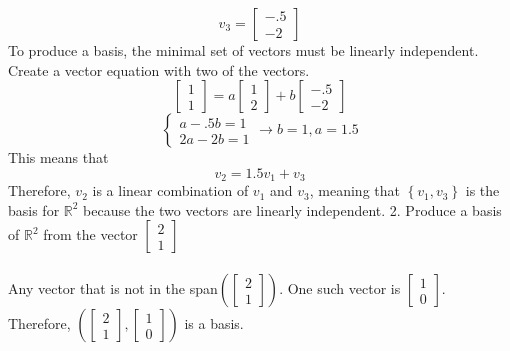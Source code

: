 \begin{enumerate}
\[  v_3 = \begin{bmatrix} -.5 \\ -2 \end{bmatrix}
\] To produce a basis, the minimal set of vectors must be linearly independent. Create a vector 
equation with two of the vectors. 
\[
  \begin{bmatrix} 1 \\ 1 \end{bmatrix} = a\begin{bmatrix} 1 \\ 2 \end{bmatrix} + 
  b\begin{bmatrix} -.5 \\ -2 \end{bmatrix}
\]
\[
  \begin{cases}
    a - .5b = 1 \\
    2a - 2b = 1
  \end{cases} \rightarrow b = 1, a = 1.5 
\] This means that 
\[
  v_2 = 1.5v_1 + v_3
\] Therefore, $v_2$ is a linear combination of $v_1$ and $v_3$, meaning that
$\left\{ v_1, v_3 \right\}$ is the basis for $\mathbb{R}^2$ because the two vectors 
are linearly independent. 
2. Produce a basis of $\mathbb{R}^2$ from the vector $\begin{bmatrix} 2 \\ 1 \end{bmatrix}$
\\\\
Any vector that is not in the span$(\begin{bmatrix} 2 \\ 1 \end{bmatrix})$. One such vector 
is $\begin{bmatrix} 1 \\ 0 \end{bmatrix}$. Therefore, $(\begin{bmatrix} 2 \\ 1 \end{bmatrix}
, \begin{bmatrix} 1 \\ 0 \end{bmatrix})$ is a basis.

\end{enumerate}
